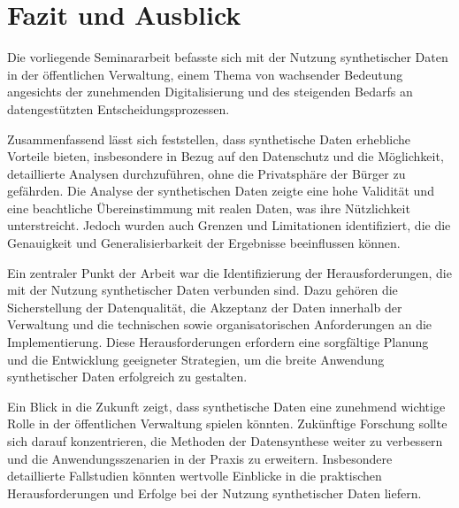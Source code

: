 \chapter{Fazit und Ausblick}
\label{cha:fazit}
\begin{spacing}{1.5}

Die vorliegende Seminararbeit befasste sich mit der Nutzung synthetischer Daten in der öffentlichen Verwaltung, einem Thema von wachsender Bedeutung angesichts der zunehmenden Digitalisierung und des steigenden Bedarfs an datengestützten Entscheidungsprozessen.

Zusammenfassend lässt sich feststellen, dass synthetische Daten erhebliche Vorteile bieten, insbesondere in Bezug auf den Datenschutz und die Möglichkeit, detaillierte Analysen durchzuführen, ohne die Privatsphäre der Bürger zu gefährden. Die Analyse der synthetischen Daten zeigte eine hohe Validität und eine beachtliche Übereinstimmung mit realen Daten, was ihre Nützlichkeit unterstreicht. Jedoch wurden auch Grenzen und Limitationen identifiziert, die die Genauigkeit und Generalisierbarkeit der Ergebnisse beeinflussen können.

Ein zentraler Punkt der Arbeit war die Identifizierung der Herausforderungen, die mit der Nutzung synthetischer Daten verbunden sind. Dazu gehören die Sicherstellung der Datenqualität, die Akzeptanz der Daten innerhalb der Verwaltung und die technischen sowie organisatorischen Anforderungen an die Implementierung. Diese Herausforderungen erfordern eine sorgfältige Planung und die Entwicklung geeigneter Strategien, um die breite Anwendung synthetischer Daten erfolgreich zu gestalten.

Ein Blick in die Zukunft zeigt, dass synthetische Daten eine zunehmend wichtige Rolle in der öffentlichen Verwaltung spielen könnten. Zukünftige Forschung sollte sich darauf konzentrieren, die Methoden der Datensynthese weiter zu verbessern und die Anwendungsszenarien in der Praxis zu erweitern. Insbesondere detaillierte Fallstudien könnten wertvolle Einblicke in die praktischen Herausforderungen und Erfolge bei der Nutzung synthetischer Daten liefern.

\end{spacing}